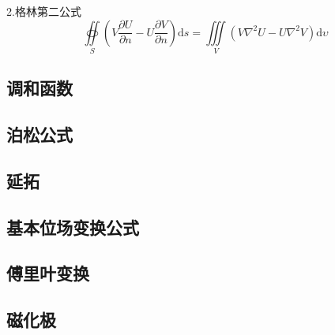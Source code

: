 \documentclass[UTF8]{ctexart}       %
\begin{document}
2.格林第二公式
$$\oiint\limits_S \left(V \frac{\partial U}{\partial n} - U\frac{\partial V}{\partial n}\right)\mathrm{d}s
=\iiint\limits_V \left(V \nabla^2 U - U \nabla^2 V \right)\mathrm{d}\upsilon$$

    \subsection{调和函数}
    \subsection{泊松公式}
    \subsection{延拓}
    \subsection{基本位场变换公式}
    \subsection{傅里叶变换}
    \subsection{磁化极}


\end{document}
